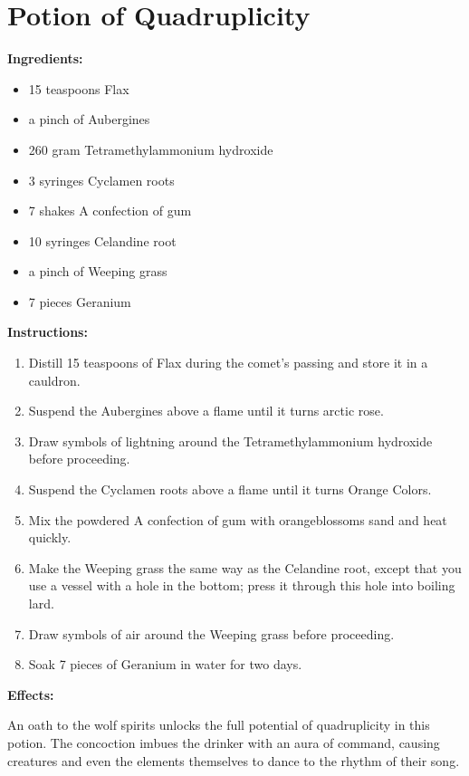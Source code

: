 \documentclass{article}
\begin{document}
\newpage
\section*{Potion of Quadruplicity}

\textbf{Ingredients:}

\begin{itemize}
  \item 15 teaspoons Flax
  \item a pinch of Aubergines
  \item 260 gram Tetramethylammonium hydroxide
  \item 3 syringes Cyclamen roots
  \item 7 shakes A confection of gum
  \item 10 syringes Celandine root
  \item a pinch of Weeping grass
  \item 7 pieces Geranium
\end{itemize}

\textbf{Instructions:}

\begin{enumerate}
  \item Distill 15 teaspoons of Flax during the comet’s passing and store it in a cauldron.
  \item Suspend the Aubergines above a flame until it turns arctic rose.
  \item Draw symbols of lightning around the Tetramethylammonium hydroxide before proceeding.
  \item Suspend the Cyclamen roots above a flame until it turns Orange Colors.
  \item Mix the powdered A confection of gum with orangeblossoms sand and heat quickly.
  \item Make the Weeping grass the same way as the Celandine root, except that you use a vessel with a hole in the bottom; press it through this hole into boiling lard.
  \item Draw symbols of air around the Weeping grass before proceeding.
  \item Soak 7 pieces of Geranium in water for two days.
\end{enumerate}

\textbf{Effects:}

An oath to the wolf spirits unlocks the full potential of quadruplicity in this potion. The concoction imbues the drinker with an aura of command, causing creatures and even the elements themselves to dance to the rhythm of their song.
\end{document}
